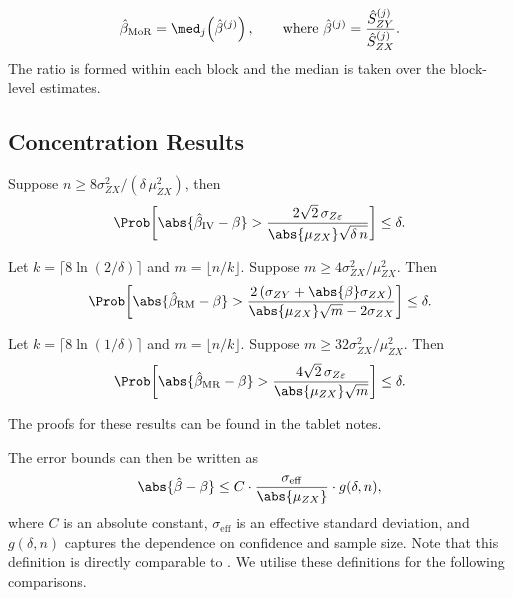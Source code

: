 \begin{definition}
\[
    \hat{\beta}_{\mathrm{MoR}} = \med_j\!\left(\hat{\beta}^{(j)}\right), \qquad \text{where } \hat{\beta}^{(j)} = \frac{\hat{S}_{ZY}^{(j)}}{\hat{S}_{ZX}^{(j)}}.
\]
The ratio is formed within each block and the median is taken over the block-level estimates.
\end{definition}


\subsection{Concentration Results}

\begin{theorem}[Standard IV]
\label{thm:iv_cheb}
Suppose $n \geq 8\sigma_{ZX}^2/(\delta\,\mu_{ZX}^2)$, then
\begin{equation}
\label{eq:iv_bound}
    \Prob\!\left[\abs{\hat{\beta}_{\mathrm{IV}} - \beta} > \frac{2\sqrt{2}\,\sigma_{Z\varepsilon}}{\abs{\mu_{ZX}}\sqrt{\delta\, n}}\right] \leq \delta.
\end{equation}
\end{theorem}

\begin{theorem}
\label{thm:rm}
Let $k = \lceil 8\ln(2/\delta) \rceil$ and $m = \lfloor n/k \rfloor$. Suppose $m \geq 4\sigma_{ZX}^2/\mu_{ZX}^2$. Then
\begin{equation}
\label{eq:rm}
    \Prob\!\left[\abs{\hat{\beta}_{\mathrm{RM}} - \beta} > \frac{2\left(\sigma_{ZY} + \abs{\beta}\sigma_{ZX}\right)}{\abs{\mu_{ZX}}\sqrt{m} - 2\sigma_{ZX}}\right] \leq \delta.
\end{equation}
\end{theorem}
 
\begin{theorem}
\label{thm:mr}
Let $k = \lceil 8\ln(1/\delta) \rceil$ and $m = \lfloor n/k \rfloor$. Suppose $m \geq 32\sigma_{ZX}^2/\mu_{ZX}^2$. Then
\begin{equation}
\label{eq:mr}
    \Prob\!\left[\abs{\hat{\beta}_{\mathrm{MR}} - \beta} > \frac{4\sqrt{2}\,\sigma_{Z\varepsilon}}{\abs{\mu_{ZX}}\sqrt{m}}\right] \leq \delta.
\end{equation}
\end{theorem}
The proofs for these results can be found in the tablet notes.

The error bounds can then be written as
\[
    \abs{\hat{\beta} - \beta} \leq C \cdot \frac{\sigma_{\mathrm{eff}}}{\abs{\mu_{ZX}}} \cdot g(\delta, n),
\]
where $C$ is an absolute constant, $\sigma_{\mathrm{eff}}$ is an effective standard deviation, and $g(\delta, n)$ captures the dependence on confidence and sample size. Note that this definition is directly comparable to . We utilise these definitions for the following comparisons.


